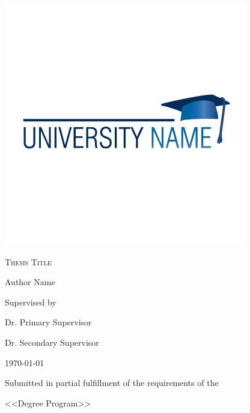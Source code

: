 \begin{titlepage}
	
	\center
	\includegraphics[scale=0.7]{Images/a.jpg}
    
    \centering
    \renewcommand{\baselinestretch}{1.7}\normalsize
    
    {\fontsize{1cm}{1.2em}\selectfont \scshape Thesis Title}

    \renewcommand{\baselinestretch}{1.25}\normalsize
    
    \vspace*{2\baselineskip}
    
    
    
    \vspace*{0.3\baselineskip}
    {\Large Author Name}
    \vspace*{0.3\baselineskip}
    
    \vfill    
    
   {Supervised by}

   \vspace*{0.3\baselineskip}
   
   {\Large Dr. Primary Supervisor}  
    \vspace*{0.3\baselineskip}
   
   {\Large Dr. Secondary Supervisor}
   \vspace*{0.5\baselineskip}
   
	
	\vfill
	\today
	
	\vspace*{2\baselineskip}
	
	    \normalsize  {{Submitted in partial fulfillment of the requirements of the}
	    
	{<<Degree Program>>}
	}
	
	    

\end{titlepage}